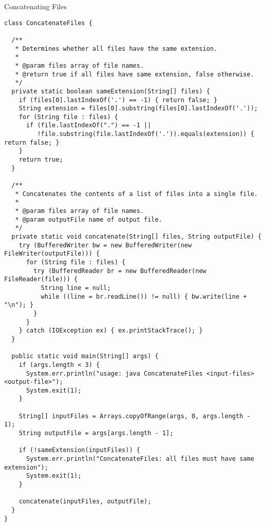 \begin{cl}{Concatenating Files}
\begin{lstlisting}[language=MyJava]
class ConcatenateFiles {
 
  /**
   * Determines whether all files have the same extension.
   * 
   * @param files array of file names.
   * @return true if all files have same extension, false otherwise.
   */
  private static boolean sameExtension(String[] files) {
    if (files[0].lastIndexOf('.') == -1) { return false; }
    String extension = files[0].substring(files[0].lastIndexOf('.'));
    for (String file : files) {
      if (file.lastIndexOf(".") == -1 || 
         !file.substring(file.lastIndexOf('.')).equals(extension)) { return false; }
    }
    return true;
  }

  /**
   * Concatenates the contents of a list of files into a single file.
   *
   * @param files array of file names.
   * @param outputFile name of output file.
   */
  private static void concatenate(String[] files, String outputFile) {
    try (BufferedWriter bw = new BufferedWriter(new FileWriter(outputFile))) {
      for (String file : files) {
        try (BufferedReader br = new BufferedReader(new FileReader(file))) {
          String line = null;
          while ((line = br.readLine()) != null) { bw.write(line + "\n"); }
        }
      }
    } catch (IOException ex) { ex.printStackTrace(); }
  }

  public static void main(String[] args) {
    if (args.length < 3) {
      System.err.println("usage: java ConcatenateFiles <input-files> <output-file>");
      System.exit(1);
    }

    String[] inputFiles = Arrays.copyOfRange(args, 0, args.length - 1);
    String outputFile = args[args.length - 1];

    if (!sameExtension(inputFiles)) {
      System.err.println("ConcatenateFiles: all files must have same extension");
      System.exit(1);
    }

    concatenate(inputFiles, outputFile);
  }
}
\end{lstlisting}
\end{cl}


